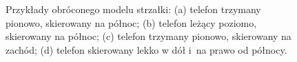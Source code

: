 \begin{figure}[!ht]
\begin{center}
 \end{center}
 \caption{
  Przykłady obróconego modelu strzałki:
  (a) telefon trzymany pionowo, skierowany na północ;
  (b) telefon leżący poziomo, skierowany na północ;
  (c) telefon trzymany pionowo, skierowany na zachód;
  (d) telefon skierowany lekko w dół i~na prawo od północy.
 }
 \label{fig:spaceGraphics_orientation}
\end{figure}
